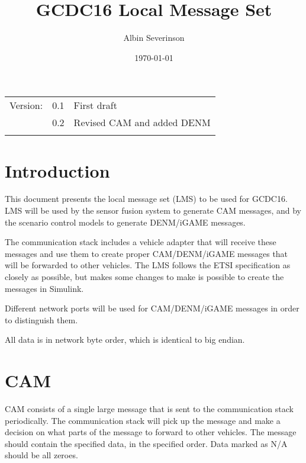 \documentclass[11pt]{article}
\author{Albin Severinson}
\date{\today}
\title{GCDC16 Local Message Set}
\begin{document}
\maketitle
\tableofcontents

\begin{center}
\begin{tabular}{lrl}
Version: & 0.1 & First draft\\
 & 0.2 & Revised CAM and added DENM\\
 &  & \\
\end{tabular}
\end{center}

\newpage
\section{Introduction}
\label{sec:orgheadline1}
This document presents the local message set (LMS) to be used for
GCDC16. LMS will be used by the sensor fusion system to generate CAM
messages, and by the scenario control models to generate DENM/iGAME
messages.

The communication stack includes a vehicle adapter that will receive
these messages and use them to create proper CAM/DENM/iGAME messages
that will be forwarded to other vehicles. The LMS follows the ETSI
specification as closely as possible, but makes some changes to make
is possible to create the messages in Simulink.

Different network ports will be used for CAM/DENM/iGAME messages in
order to distinguish them.

All data is in network byte order, which is identical to big endian.

\section{CAM}
\label{sec:orgheadline2}
CAM consists of a single large message that is sent to the
communication stack periodically. The communication stack will pick up
the message and make a decision on what parts of the message to forward
to other vehicles. The message should contain the specified data, in
the specified order. Data marked as N/A should be all zeroes.
\end{document}
